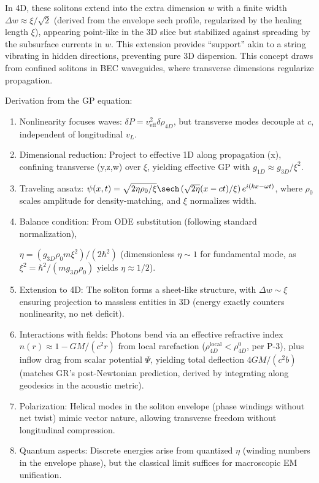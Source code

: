 In 4D, these solitons extend into the extra dimension $w$ with a finite width $\Delta w \approx \xi / \sqrt{2}$ (derived from the envelope sech profile, regularized by the healing length $\xi$), appearing point-like in the 3D slice but stabilized against spreading by the subsurface currents in $w$. This extension provides ``support'' akin to a string vibrating in hidden directions, preventing pure 3D dispersion. This concept draws from confined solitons in BEC waveguides, where transverse dimensions regularize propagation.

Derivation from the GP equation:
\begin{enumerate}
    \item Nonlinearity focuses waves: $\delta P = v_{\text{eff}}^2 \delta \rho_{4D}$, but transverse modes decouple at $c$, independent of longitudinal $v_L$.
    \item Dimensional reduction: Project to effective 1D along propagation (x), confining transverse (y,z,w) over $\xi$, yielding effective GP with $g_{1D} \approx g_{3D}/\xi^2$.
    \item Traveling ansatz: $\psi(x,t) = \sqrt{2 \eta \rho_0 / \xi} \sech\left( \sqrt{2 \eta} (x - c t)/ \xi \right) e^{i (k x - \omega t)}$, where $\rho_0$ scales amplitude for density-matching, and $\xi$ normalizes width.
    \item Balance condition: From ODE substitution (following standard normalization),
    
    $\eta = (g_{3D} \rho_0 m \xi^2)/(2\hbar^2)$ (dimensionless $\eta \sim 1$ for fundamental mode, as $\xi^2 = \hbar^2 / (m g_{3D} \rho_0)$ yields $\eta \approx 1/2$).
    \item Extension to 4D: The soliton forms a sheet-like structure, with $\Delta w \sim \xi$ ensuring projection to massless entities in 3D (energy exactly counters nonlinearity, no net deficit).
    \item Interactions with fields: Photons bend via an effective refractive index $n(r) \approx 1 - G M / (c^2 r)$ from local rarefaction ($\rho_{4D}^{\text{local}} < \rho_{4D}^0$, per P-3), plus inflow drag from scalar potential $\Psi$, yielding total deflection $4 G M / (c^2 b)$ (matches GR's post-Newtonian prediction, derived by integrating along geodesics in the acoustic metric).
    \item Polarization: Helical modes in the soliton envelope (phase windings without net twist) mimic vector nature, allowing transverse freedom without longitudinal compression.
    \item Quantum aspects: Discrete energies arise from quantized $\eta$ (winding numbers in the envelope phase), but the classical limit suffices for macroscopic EM unification.
\end{enumerate}

